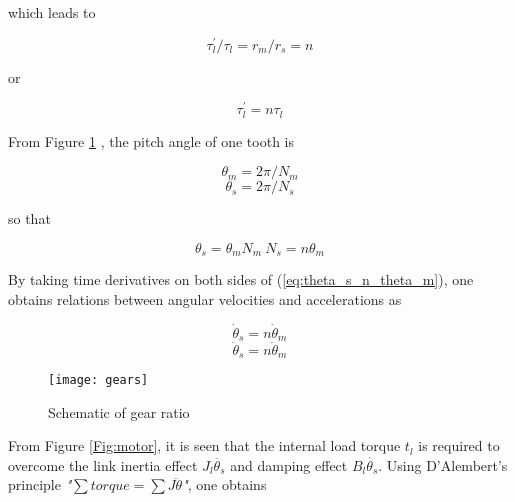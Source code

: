 \noindent which leads to

\begin{equation} \label{eq:tl/tl}
	\tau_l^{'}/\tau_l = r_m/r_s = n
\end{equation}

\noindent or

\begin{equation} \label{eq:tl_n_tl}
	\tau_l^{'} = n \tau_l
\end{equation}

\noindent From Figure \ref{Fig:gears} , the pitch angle of one tooth is

\begin{equation} \label{eq:theta_m}
	\theta_m = 2 \pi / N_m
\end{equation}
% 
\begin{equation} \label{eq:theta_s}
	\theta_s = 2 \pi / N_s
\end{equation}

\noindent so that

\begin{equation}	\label{eq:theta_s_n_theta_m}
	\theta_s = \theta_m N_m \ N_s = n \theta_m
\end{equation}

\noindent By taking time derivatives on both sides of (\ref{eq:theta_s_n_theta_m}), one obtains relations between angular velocities and accelerations as

\begin{equation} \label{eq:dot_theta_s}
	\dot{\theta}_s = n\dot{\theta}_m
\end{equation}
%
\begin{equation} \label{eq:dot_theta_m}
	\ddot{\theta}_s = n \ddot{\theta}_m
\end{equation}

\begin{figure}[b]
	\begin{center}
		\texttt{[image: gears]}
		\caption{Schematic of gear ratio}
		\label{Fig:gears}
	\end{center}
\end{figure}


From Figure \ref{Fig:motor}, it is seen that the internal load torque $t_l$ is required to overcome the link inertia effect $J_l \ddot{\theta_s}$ and damping effect $B_l \dot{\theta_s}$. Using D'Alembert's principle \textit{"$\sum{torque} = \sum{J \ddot{\theta}}$"}, one obtains

